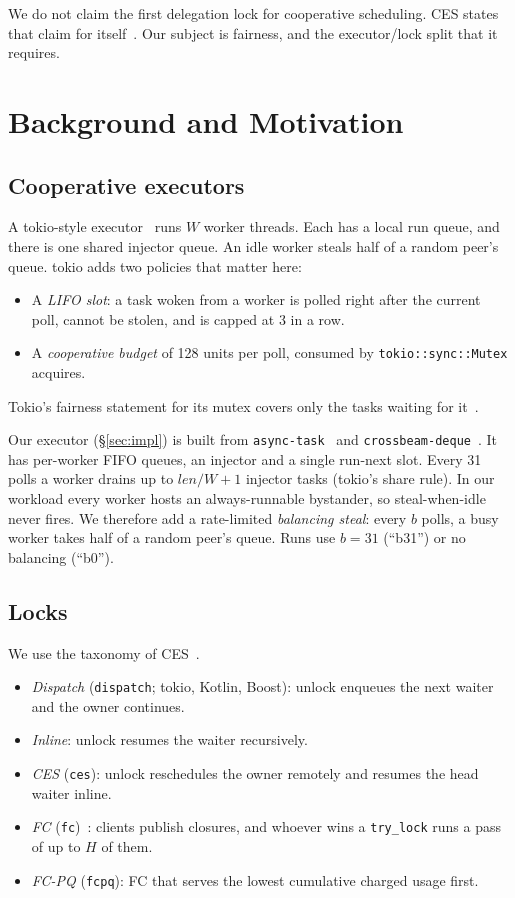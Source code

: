 \documentclass[10pt,twocolumn]{article}
\newcommand{\lk}[1]{\texttt{#1}}
\begin{document}
We do not claim the first delegation lock for cooperative scheduling. CES
states that claim for itself~\cite{ces}. Our subject is fairness, and the
executor/lock split that it requires.

\section{Background and Motivation}\label{sec:motiv}

\subsection{Cooperative executors}
A tokio-style executor~\cite{tokio} runs $W$ worker threads. Each has a local
run queue, and there is one shared injector queue. An idle worker steals half
of a random peer's queue. tokio adds two policies that matter here:
\begin{itemize}
\item A \emph{LIFO slot}: a task woken from a worker is polled right after the
  current poll, cannot be stolen, and is capped at 3 in a row.
\item A \emph{cooperative budget} of 128 units per poll, consumed by
  \lk{tokio::sync::Mutex} acquires.
\end{itemize}
Tokio's fairness statement for its mutex covers only the tasks waiting for
it~\cite{tokio6049}.

Our executor (\S\ref{sec:impl}) is built from \lk{async-task}~\cite{asynctask}
and \lk{crossbeam-deque}~\cite{crossbeam}. It has per-worker FIFO queues, an
injector and a single run-next slot. Every 31 polls a worker drains up to
$\mathit{len}/W{+}1$ injector tasks (tokio's share rule). In our workload every
worker hosts an always-runnable bystander, so steal-when-idle never fires. We
therefore add a rate-limited \emph{balancing steal}: every $b$ polls, a busy
worker takes half of a random peer's queue. Runs use $b{=}31$ (``b31'') or no
balancing (``b0'').

\subsection{Locks}
We use the taxonomy of CES~\cite{ces}.
\begin{itemize}
\item \emph{Dispatch} (\lk{dispatch}; tokio, Kotlin, Boost): unlock enqueues
  the next waiter and the owner continues.
\item \emph{Inline}: unlock resumes the waiter recursively.
\item \emph{CES} (\lk{ces}): unlock reschedules the owner remotely and resumes
  the head waiter inline.
\item \emph{FC} (\lk{fc})~\cite{fc}: clients publish closures, and whoever wins
  a \lk{try\_lock} runs a pass of up to $H$ of them.
\item \emph{FC-PQ} (\lk{fcpq}): FC that serves the lowest cumulative charged
  usage first.
\end{itemize}
\end{document}
